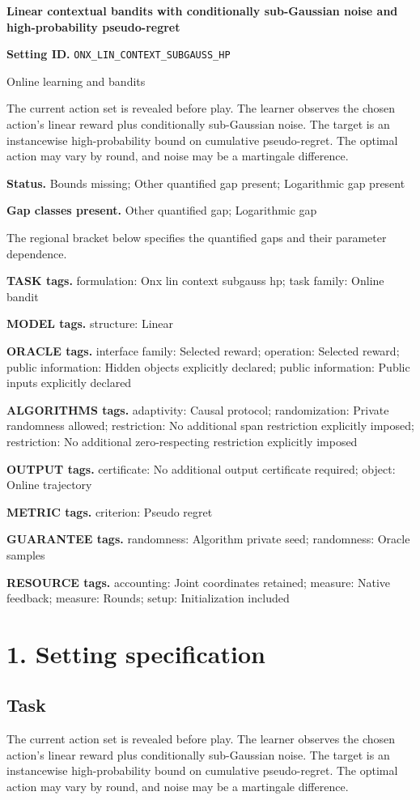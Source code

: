 \documentclass[10pt,a4paper]{article}
\begin{document}
\raggedright

{\LARGE\bfseries\sffamily\color{AtlasNavy} Linear contextual bandits with conditionally sub-Gaussian noise and high-probability pseudo-regret\par}\vspace{5pt}
\textbf{Setting ID.} \texttt{ONX\_\allowbreak{}LIN\_\allowbreak{}CONTEXT\_\allowbreak{}SUBGAUSS\_\allowbreak{}HP}

Online learning and bandits

The current action set is revealed before play. The learner observes the chosen action's linear reward plus conditionally sub-Gaussian noise. The target is an instancewise high-probability bound on cumulative pseudo-regret. The optimal action may vary by round, and noise may be a martingale difference.

\textbf{Status.} Bounds missing; Other quantified gap present; Logarithmic gap present

\textbf{Gap classes present.} Other quantified gap; Logarithmic gap

The regional bracket below specifies the quantified gaps and their parameter dependence.

\textbf{TASK tags.} formulation: Onx lin context subgauss hp; task family: Online bandit

\textbf{MODEL tags.} structure: Linear

\textbf{ORACLE tags.} interface family: Selected reward; operation: Selected reward; public information: Hidden objects explicitly declared; public information: Public inputs explicitly declared

\textbf{ALGORITHMS tags.} adaptivity: Causal protocol; randomization: Private randomness allowed; restriction: No additional span restriction explicitly imposed; restriction: No additional zero-respecting restriction explicitly imposed

\textbf{OUTPUT tags.} certificate: No additional output certificate required; object: Online trajectory

\textbf{METRIC tags.} criterion: Pseudo regret

\textbf{GUARANTEE tags.} randomness: Algorithm private seed; randomness: Oracle samples

\textbf{RESOURCE tags.} accounting: Joint coordinates retained; measure: Native feedback; measure: Rounds; setup: Initialization included

\section{1. Setting specification}
\subsection{Task}
The current action set is revealed before play. The learner observes the chosen action's linear reward plus conditionally sub-Gaussian noise. The target is an instancewise high-probability bound on cumulative pseudo-regret. The optimal action may vary by round, and noise may be a martingale difference.
\end{document}
